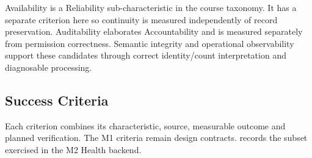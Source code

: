 Availability is a Reliability sub-characteristic in the course taxonomy. It has a separate criterion here so continuity is
measured independently of record preservation. Auditability elaborates
Accountability and is measured separately from permission correctness.
Semantic integrity and operational observability support these
candidates through correct identity/count interpretation and diagnosable
processing.

\subsection{Success Criteria}\label{sec:3.2}

Each criterion combines its characteristic, source, measurable outcome
and planned verification. The M1 criteria remain design contracts.
 records the subset exercised in the M2
Health backend.

